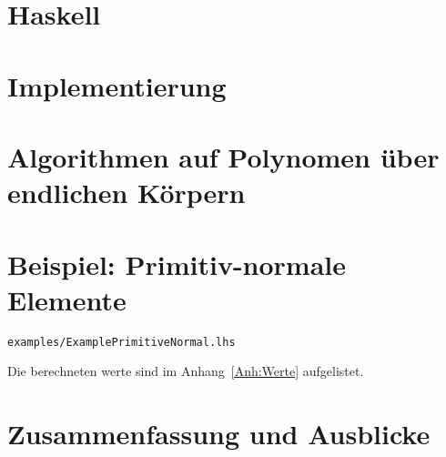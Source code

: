 \documentclass[ngerman
  ,fontsize=11pt %
  ,numbers=noenddot %
  ,parskip=half*
  ,openany
  ,DIV=10
  ,fleqn %
  ,oneside
  ,DIV=10
]{./myClass}
\begin{document}
\ifnum{}
  \frontmatter
  
  \newpage \thispagestyle{empty} \mbox{}
\else
  \mainmatter
\fi

\tableofcontents{}


\ifnum{}
  \mainmatter
\fi

%

\chapter{Haskell}


\chapter{Implementierung}








\chapter{Algorithmen auf Polynomen über endlichen Körpern}
\label{chap:algs}





%
\chapter{Beispiel: Primitiv-normale Elemente}
\label{chap:bsp-prim-norm}
\texttt{examples/ExamplePrimitiveNormal.lhs}


Die berechneten werte sind im Anhang~\ref{Anh:Werte} aufgelistet.


\chapter{Zusammenfassung und Ausblicke}


\pagebreak
\appendix
{}



\pagebreak
\printbibliography



\end{document}
